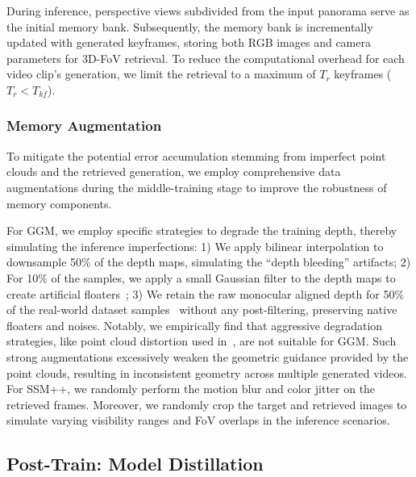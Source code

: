 \documentclass{article} %
\begin{document}
During inference, perspective views subdivided from the input panorama serve as the initial memory bank. Subsequently, the memory bank is incrementally updated with generated keyframes, storing both RGB images and camera parameters for 3D-FoV retrieval. 
To reduce the computational overhead for each video clip's generation, we limit the retrieval to a maximum of $T_r$ keyframes ($T_r < T_{kf}$).


\subsubsection{Memory Augmentation}
\label{sec:mem_aug}

To mitigate the potential error accumulation stemming from imperfect point clouds and the retrieved generation, we employ comprehensive data augmentations during the middle-training stage to improve the robustness of memory components.


For GGM, we employ specific strategies to degrade the training depth, thereby simulating the inference imperfections: 1) We apply bilinear interpolation to downsample 50\% of the depth maps, simulating the ``depth bleeding'' artifacts; 2) For 10\% of the samples, we apply a small Gaussian filter to the depth maps to create artificial floaters~\cite{yang2026neoverse}; 3) We retain the raw monocular aligned depth for 50\% of the real-world dataset samples~\cite{ling2024dl3dv,arnold2022map,xia2024rgbd} without any post-filtering, preserving native floaters and noises.
Notably, we empirically find that aggressive degradation strategies, like point cloud distortion used in~\cite{yang2026neoverse}, are not suitable for GGM.
Such strong augmentations excessively weaken the geometric guidance provided by the point clouds, resulting in inconsistent geometry across multiple generated videos.
For SSM++, we randomly perform the motion blur and color jitter on the retrieved frames. Moreover, we randomly crop the target and retrieved images to simulate varying visibility ranges and FoV overlaps in the inference scenarios.


\subsection{Post-Train: Model Distillation}
\label{sec:dmd}
\end{document}
